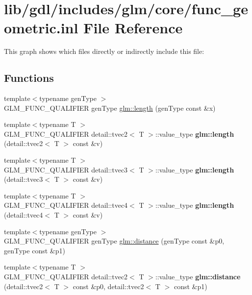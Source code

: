 \hypertarget{func__geometric_8inl}{}\section{lib/gdl/includes/glm/core/func\+\_\+geometric.inl File Reference}
\label{func__geometric_8inl}
This graph shows which files directly or indirectly include this file\+:
\subsection*{Functions}
\begin{DoxyCompactItemize}
\item 
{\footnotesize template$<$typename gen\+Type $>$ }\\G\+L\+M\+\_\+\+F\+U\+N\+C\+\_\+\+Q\+U\+A\+L\+I\+F\+I\+E\+R gen\+Type \hyperlink{group__core__func__geometric_ga03b2831439defb8922832b540b91b8a7}{glm\+::length} (gen\+Type const \&x)
\item 
\hypertarget{namespaceglm_a9b274882b38ddb0bd507c845e41e7cb5}{}{\footnotesize template$<$typename T $>$ }\\G\+L\+M\+\_\+\+F\+U\+N\+C\+\_\+\+Q\+U\+A\+L\+I\+F\+I\+E\+R detail\+::tvec2$<$ T $>$\+::value\+\_\+type {\bfseries glm\+::length} (detail\+::tvec2$<$ T $>$ const \&v)\label{namespaceglm_a9b274882b38ddb0bd507c845e41e7cb5}

\item 
\hypertarget{namespaceglm_a191bf91c699b38f4b7807e23fd809e97}{}{\footnotesize template$<$typename T $>$ }\\G\+L\+M\+\_\+\+F\+U\+N\+C\+\_\+\+Q\+U\+A\+L\+I\+F\+I\+E\+R detail\+::tvec3$<$ T $>$\+::value\+\_\+type {\bfseries glm\+::length} (detail\+::tvec3$<$ T $>$ const \&v)\label{namespaceglm_a191bf91c699b38f4b7807e23fd809e97}

\item 
\hypertarget{namespaceglm_a0668efb90859b9cb66f31889cdf04aef}{}{\footnotesize template$<$typename T $>$ }\\G\+L\+M\+\_\+\+F\+U\+N\+C\+\_\+\+Q\+U\+A\+L\+I\+F\+I\+E\+R detail\+::tvec4$<$ T $>$\+::value\+\_\+type {\bfseries glm\+::length} (detail\+::tvec4$<$ T $>$ const \&v)\label{namespaceglm_a0668efb90859b9cb66f31889cdf04aef}

\item 
{\footnotesize template$<$typename gen\+Type $>$ }\\G\+L\+M\+\_\+\+F\+U\+N\+C\+\_\+\+Q\+U\+A\+L\+I\+F\+I\+E\+R gen\+Type \hyperlink{group__core__func__geometric_ga00716eae37e8ae2a76ca7799f9c75682}{glm\+::distance} (gen\+Type const \&p0, gen\+Type const \&p1)
\item 
\hypertarget{namespaceglm_a02e1b17b70ee3ddd270c01aea45e5e82}{}{\footnotesize template$<$typename T $>$ }\\G\+L\+M\+\_\+\+F\+U\+N\+C\+\_\+\+Q\+U\+A\+L\+I\+F\+I\+E\+R detail\+::tvec2$<$ T $>$\+::value\+\_\+type {\bfseries glm\+::distance} (detail\+::tvec2$<$ T $>$ const \&p0, detail\+::tvec2$<$ T $>$ const \&p1)\label{namespaceglm_a02e1b17b70ee3ddd270c01aea45e5e82}


\end{DoxyCompactItemize}
